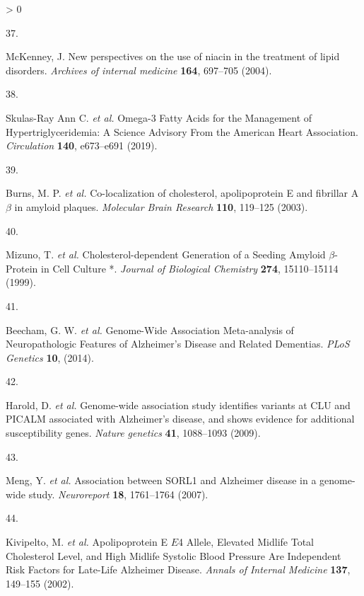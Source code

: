 \documentclass[a4paper, twoside]{templates/ociamthesis}
\newlength{\cslhangindent}
\newlength{\csllabelwidth}
\newenvironment{CSLReferences}[3] %
 {%
  \setlength{\parindent}{0pt}
  \ifodd #1 \everypar{\setlength{\hangindent}{\cslhangindent}}\ignorespaces\fi
  \ifnum #2 > 0
  \setlength{\parskip}{#2\baselineskip}
  \fi
 }%
 {}
\newcommand{\CSLLeftMargin}[1]{\parbox[t]{\maxof{\widthof{#1}}{\csllabelwidth}}{#1}}
\newcommand{\CSLRightInline}[1]{\parbox[t]{\linewidth - \csllabelwidth}{#1}}
\begin{document}
\begin{CSLReferences}{0}{0}
\leavevmode\hypertarget{ref-mckenney2004new}{}%
\CSLLeftMargin{37. }
\CSLRightInline{McKenney, J. New perspectives on the use of niacin in the treatment of lipid disorders. \emph{Archives of internal medicine} \textbf{164}, 697--705 (2004).}

\leavevmode\hypertarget{ref-skulas-rayannc.2019}{}%
\CSLLeftMargin{38. }
\CSLRightInline{Skulas-Ray Ann C. \emph{et al.} Omega-3 {Fatty Acids} for the {Management} of {Hypertriglyceridemia}: {A Science Advisory From} the {American Heart Association}. \emph{Circulation} \textbf{140}, e673--e691 (2019).}

\leavevmode\hypertarget{ref-burns2003}{}%
\CSLLeftMargin{39. }
\CSLRightInline{Burns, M. P. \emph{et al.} Co-localization of cholesterol, apolipoprotein {E} and fibrillar {A\(\beta\)} in amyloid plaques. \emph{Molecular Brain Research} \textbf{110}, 119--125 (2003).}

\leavevmode\hypertarget{ref-mizuno1999}{}%
\CSLLeftMargin{40. }
\CSLRightInline{Mizuno, T. \emph{et al.} Cholesterol-dependent {Generation} of a {Seeding Amyloid} {\(\beta\)}-{Protein} in {Cell Culture} *. \emph{Journal of Biological Chemistry} \textbf{274}, 15110--15114 (1999).}

\leavevmode\hypertarget{ref-beecham2014}{}%
\CSLLeftMargin{41. }
\CSLRightInline{Beecham, G. W. \emph{et al.} Genome-{Wide Association Meta}-analysis of {Neuropathologic Features} of {Alzheimer}'s {Disease} and {Related Dementias}. \emph{PLoS Genetics} \textbf{10}, (2014).}

\leavevmode\hypertarget{ref-harold2009}{}%
\CSLLeftMargin{42. }
\CSLRightInline{Harold, D. \emph{et al.} Genome-wide association study identifies variants at {CLU} and {PICALM} associated with {Alzheimer}'s disease, and shows evidence for additional susceptibility genes. \emph{Nature genetics} \textbf{41}, 1088--1093 (2009).}

\leavevmode\hypertarget{ref-meng2007}{}%
\CSLLeftMargin{43. }
\CSLRightInline{Meng, Y. \emph{et al.} Association between {SORL1} and {Alzheimer} disease in a genome-wide study. \emph{Neuroreport} \textbf{18}, 1761--1764 (2007).}

\leavevmode\hypertarget{ref-kivipelto2002}{}%
\CSLLeftMargin{44. }
\CSLRightInline{Kivipelto, M. \emph{et al.} Apolipoprotein {E} {\(E\)}4 {Allele}, {Elevated Midlife Total Cholesterol Level}, and {High Midlife Systolic Blood Pressure Are Independent Risk Factors} for {Late}-{Life Alzheimer Disease}. \emph{Annals of Internal Medicine} \textbf{137}, 149--155 (2002).}


\end{CSLReferences}
\end{document}
